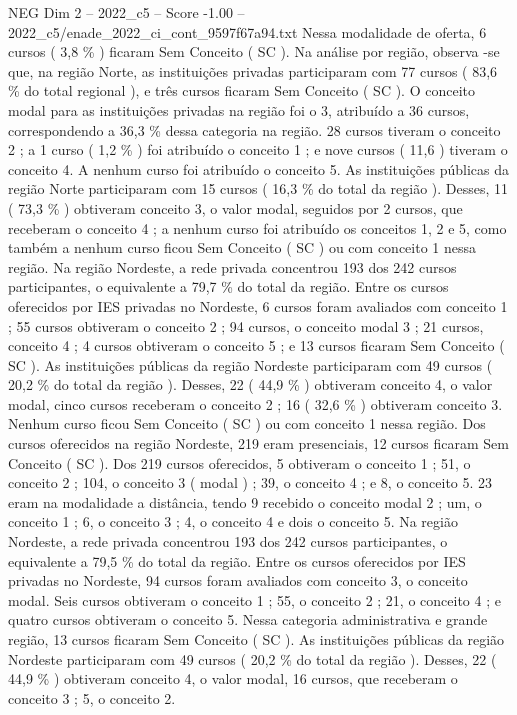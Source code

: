 \begin{textsample}{NEG Dim 2 – 2022\_c5 – Score -1.00 – 2022\_c5/enade\_2022\_ci\_cont\_9597f67a94.txt}
Nessa modalidade de oferta, 6 cursos ( 3,8 \% ) ficaram Sem Conceito ( SC ).
Na análise por região, observa -se que, na região Norte, as instituições privadas participaram com 77 cursos ( 83,6 \% do total regional ), e três cursos ficaram Sem Conceito ( SC ).
O conceito modal para as instituições privadas na região foi o 3, atribuído a 36 cursos, correspondendo a 36,3 \% dessa categoria na região. 28 cursos tiveram o conceito 2 ; a 1 curso ( 1,2 \% ) foi atribuído o conceito 1 ; e nove cursos ( 11,6 ) tiveram o conceito 4.
A nenhum curso foi atribuído o conceito 5.
As instituições públicas da região Norte participaram com 15 cursos ( 16,3 \% do total da região ).
Desses, 11 ( 73,3 \% ) obtiveram conceito 3, o valor modal, seguidos por 2 cursos, que receberam o conceito 4 ; a nenhum curso foi atribuído os conceitos 1, 2 e 5, como também a nenhum curso ficou Sem Conceito ( SC ) ou com conceito 1 nessa região.
Na região Nordeste, a rede privada concentrou 193 dos 242 cursos participantes, o equivalente a 79,7 \% do total da região.
Entre os cursos oferecidos por IES privadas no Nordeste, 6 cursos foram avaliados com conceito 1 ; 55 cursos obtiveram o conceito 2 ; 94 cursos, o conceito modal 3 ; 21 cursos, conceito 4 ; 4 cursos obtiveram o conceito 5 ; e 13 cursos ficaram Sem Conceito ( SC ).
As instituições públicas da região Nordeste participaram com 49 cursos ( 20,2 \% do total da região ).
Desses, 22 ( 44,9 \% ) obtiveram conceito 4, o valor modal, cinco cursos receberam o conceito 2 ; 16 ( 32,6 \% ) obtiveram conceito 3.
Nenhum curso ficou Sem Conceito ( SC ) ou com conceito 1 nessa região.
Dos cursos oferecidos na região Nordeste, 219 eram presenciais, 12 cursos ficaram Sem Conceito ( SC ).
Dos 219 cursos oferecidos, 5 obtiveram o conceito 1 ; 51, o conceito 2 ; 104, o conceito 3 ( modal ) ; 39, o conceito 4 ; e 8, o conceito 5. 23 eram na modalidade a distância, tendo 9 recebido o conceito modal 2 ; um, o conceito 1 ; 6, o conceito 3 ; 4, o conceito 4 e dois o conceito 5.
Na região Nordeste, a rede privada concentrou 193 dos 242 cursos participantes, o equivalente a 79,5 \% do total da região.
Entre os cursos oferecidos por IES privadas no Nordeste, 94 cursos foram avaliados com conceito 3, o conceito modal.
Seis cursos obtiveram o conceito 1 ; 55, o conceito 2 ; 21, o conceito 4 ; e quatro cursos obtiveram o conceito 5.
Nessa categoria administrativa e grande região, 13 cursos ficaram Sem Conceito ( SC ).
As instituições públicas da região Nordeste participaram com 49 cursos ( 20,2 \% do total da região ).
Desses, 22 ( 44,9 \% ) obtiveram conceito 4, o valor modal, 16 cursos, que receberam o conceito 3 ; 5, o conceito 2.

\end{textsample}
